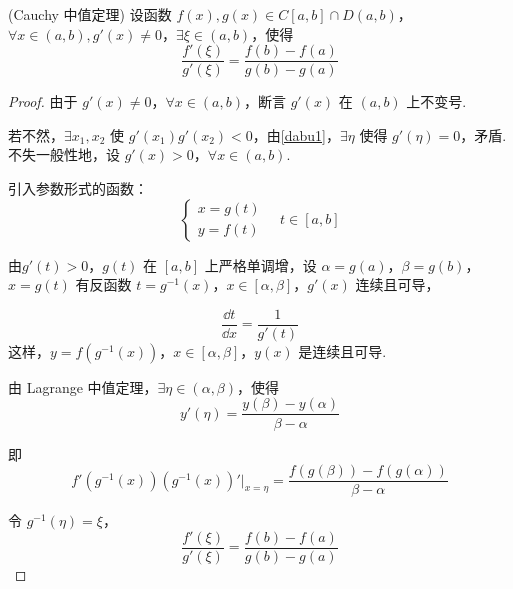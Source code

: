 \begin{theorem}(Cauchy 中值定理)
	设函数 \( f(x), g(x) \in C[a,b] \cap D(a,b) \)，\( \forall x \in (a,b), g'(x) \neq 0 \)，\( \exists \xi \in (a,b) \)，使得
	\[
	\frac{f'( \xi)}{g'(\xi)} = \frac{f(b) - f(a)}{g(b) - g(a)}
	\]
\end{theorem}
\begin{proof}
	由于 \( g'(x) \neq 0 \)，\( \forall x \in (a,b) \)，断言 \( g'(x) \) 在 \((a,b)\) 上不变号.
	
	若不然，\( \exists x_1, x_2 \) 使 \( g'(x_1)g'(x_2) < 0 \)，由\ref{dabu1}，\( \exists \eta \) 使得 \( g'(\eta) = 0 \)，矛盾.不失一般性地，设 \( g'(x) > 0 \)，\( \forall x \in (a,b) \).
	
	引入参数形式的函数：
	\[
	\begin{cases}
		x = g(t) \\
		y = f(t)
	\end{cases}
	\quad t \in [a,b]
	\]
	
	由\( g'(t) >0 \)，\( g(t) \) 在 \([a,b]\) 上严格单调增，设 \( \alpha = g(a) \)，\( \beta = g(b) \)，\( x = g(t) \) 有反函数 \( t = g^{-1}(x) \)，\( x \in [\alpha, \beta] \)，\( g'(x) \) 连续且可导，
	
	\[
	\frac{\dd t}{\dd x} = \frac{1}{g'(t)}
	\]
	这样，\( y = f(g^{-1}(x)) \)，\( x \in [\alpha, \beta] \)，\( y(x) \) 是连续且可导.
	
	由 Lagrange 中值定理，\( \exists \eta \in (\alpha, \beta) \)，使得
	\[
	y'(\eta) = \frac{y(\beta) - y(\alpha)}{\beta - \alpha}
	\]
	
	即
	\[
	f'(g^{-1}(x))(g^{-1}(x))'\big|_{x=\eta} = \frac{f(g(\beta)) - f(g(\alpha))}{\beta - \alpha}
	\]
	
	令 \( g^{-1}(\eta) = \xi \)，
	\[
	\frac{f'(\xi)}{g'(\xi)} = \frac{f(b) - f(a)}{g(b) - g(a)}
	\]
	
\end{proof}

